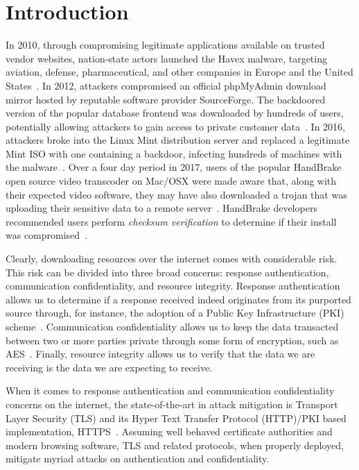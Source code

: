 \section{Introduction} \label{sec:introduction}

In 2010, through compromising legitimate applications available on trusted
vendor websites, nation-state actors launched the Havex malware, targeting
aviation, defense, pharmaceutical, and other companies in Europe and the United
States~\cite{SCA-HAVEX1, SCA-HAVEX2}. In 2012, attackers compromised an official
phpMyAdmin download mirror hosted by reputable software provider SourceForge.
The backdoored version of the popular database frontend was downloaded by
hundreds of users, potentially allowing attackers to gain access to private
customer data~\cite{SCA-PMA1, SCA-PMA2}. In 2016, attackers broke into the Linux
Mint distribution server and replaced a legitimate Mint ISO with one containing
a backdoor, infecting hundreds of machines with the malware~\cite{SCA-MINT1,
SCA-MINT2}. Over a four day period in 2017, users of the popular HandBrake open
source video transcoder on Mac/OSX were made aware that, along with their
expected video software, they may have also downloaded a trojan that was
uploading their sensitive data to a remote server~\cite{SCA-HB1}. HandBrake
developers recommended users perform \emph{checksum verification} to determine
if their install was compromised~\cite{SCA-HB2}.

Clearly, downloading resources over the internet comes with considerable risk.
This risk can be divided into three broad concerns: response authentication,
communication confidentiality, and resource integrity. Response authentication
allows us to determine if a response received indeed originates from its
purported source through, for instance, the adoption of a Public Key
Infrastructure (PKI) scheme~\cite{PKI}. Communication confidentiality allows us
to keep the data transacted between two or more parties private through some
form of encryption, such as AES~\cite{AES}. Finally, resource integrity allows
us to verify that the data we are receiving is the data we are expecting to
receive.

When it comes to response authentication and communication confidentiality
concerns on the internet, the state-of-the-art in attack mitigation is Transport
Layer Security (TLS) and its Hyper Text Transfer Protocol (HTTP)/PKI based
implementation, HTTPS~\cite{TLS1.2, TLS1, TLS0, HTTPS, PKI}. Assuming well
behaved certificate authorities and modern browsing software, TLS and related
protocols, when properly deployed, mitigate myriad attacks on authentication and
confidentiality.

